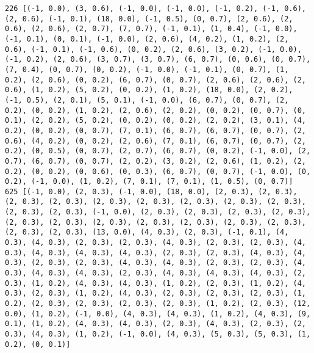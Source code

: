 \documentclass[11pt]{article}
\begin{document}
\begin{Verbatim}[commandchars=\\\{\}]
226 [(-1, 0.0), (3, 0.6), (-1, 0.0), (-1, 0.0), (-1, 0.2), (-1, 0.6), (2, 0.6), (-1, 0.1), (18, 0.0), (-1, 0.5), (0, 0.7), (2, 0.6), (2, 0.6), (2, 0.6), (2, 0.7), (7, 0.7), (-1, 0.1), (1, 0.4), (-1, 0.0), (-1, 0.1), (0, 0.1), (-1, 0.0), (2, 0.6), (4, 0.2), (1, 0.2), (2, 0.6), (-1, 0.1), (-1, 0.6), (0, 0.2), (2, 0.6), (3, 0.2), (-1, 0.0), (-1, 0.2), (2, 0.6), (3, 0.7), (3, 0.7), (6, 0.7), (0, 0.6), (0, 0.7), (7, 0.4), (0, 0.7), (0, 0.2), (-1, 0.0), (-1, 0.1), (0, 0.7), (1, 0.2), (2, 0.6), (0, 0.2), (6, 0.7), (0, 0.7), (2, 0.6), (2, 0.6), (2, 0.6), (1, 0.2), (5, 0.2), (0, 0.2), (1, 0.2), (18, 0.0), (2, 0.2), (-1, 0.5), (2, 0.1), (5, 0.1), (-1, 0.0), (6, 0.7), (0, 0.7), (2, 0.2), (0, 0.2), (1, 0.2), (2, 0.6), (2, 0.2), (0, 0.2), (0, 0.7), (0, 0.1), (2, 0.2), (5, 0.2), (0, 0.2), (0, 0.2), (2, 0.2), (3, 0.1), (4, 0.2), (0, 0.2), (0, 0.7), (7, 0.1), (6, 0.7), (6, 0.7), (0, 0.7), (2, 0.6), (4, 0.2), (0, 0.2), (2, 0.6), (7, 0.1), (6, 0.7), (0, 0.7), (2, 0.2), (0, 0.5), (0, 0.7), (2, 0.7), (6, 0.7), (0, 0.2), (-1, 0.0), (2, 0.7), (6, 0.7), (0, 0.7), (2, 0.2), (3, 0.2), (2, 0.6), (1, 0.2), (2, 0.2), (0, 0.2), (0, 0.6), (0, 0.3), (6, 0.7), (0, 0.7), (-1, 0.0), (0, 0.2), (-1, 0.0), (1, 0.2), (7, 0.1), (7, 0.1), (1, 0.5), (0, 0.7)]
625 [(-1, 0.0), (2, 0.3), (-1, 0.0), (18, 0.0), (2, 0.3), (2, 0.3), (2, 0.3), (2, 0.3), (2, 0.3), (2, 0.3), (2, 0.3), (2, 0.3), (2, 0.3), (2, 0.3), (2, 0.3), (-1, 0.0), (2, 0.3), (2, 0.3), (2, 0.3), (2, 0.3), (2, 0.3), (2, 0.3), (2, 0.3), (2, 0.3), (2, 0.3), (2, 0.3), (2, 0.3), (2, 0.3), (2, 0.3), (13, 0.0), (4, 0.3), (2, 0.3), (-1, 0.1), (4, 0.3), (4, 0.3), (2, 0.3), (2, 0.3), (4, 0.3), (2, 0.3), (2, 0.3), (4, 0.3), (4, 0.3), (4, 0.3), (4, 0.3), (2, 0.3), (2, 0.3), (4, 0.3), (4, 0.3), (2, 0.3), (2, 0.3), (4, 0.3), (4, 0.3), (2, 0.3), (2, 0.3), (4, 0.3), (4, 0.3), (4, 0.3), (2, 0.3), (4, 0.3), (4, 0.3), (4, 0.3), (2, 0.3), (1, 0.2), (4, 0.3), (4, 0.3), (1, 0.2), (2, 0.3), (1, 0.2), (4, 0.3), (2, 0.3), (1, 0.2), (4, 0.3), (2, 0.3), (2, 0.3), (2, 0.3), (1, 0.2), (2, 0.3), (2, 0.3), (2, 0.3), (2, 0.3), (1, 0.2), (2, 0.3), (12, 0.0), (1, 0.2), (-1, 0.0), (4, 0.3), (4, 0.3), (1, 0.2), (4, 0.3), (9, 0.1), (1, 0.2), (4, 0.3), (4, 0.3), (2, 0.3), (4, 0.3), (2, 0.3), (2, 0.3), (4, 0.3), (1, 0.2), (-1, 0.0), (4, 0.3), (5, 0.3), (5, 0.3), (1, 0.2), (0, 0.1)]

\end{Verbatim}
\end{document}
